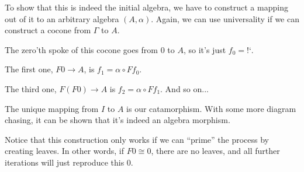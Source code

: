 \documentclass[DaoFP]{subfiles}
\begin{document}
To show that this is indeed the initial algebra, we have to construct a mapping out of it to an arbitrary algebra $(A, \alpha)$. Again, we can use universality if we can construct a cocone from $\Gamma$ to $A$. 

The zero'th spoke of this cocone goes from $0$ to $A$, so it's just $f_0 = \mbox{!`}$.

The first one, $F 0 \to A$, is $f_1 = \alpha \circ F f_0$. 

The third one, $F (F 0) \to A$ is  $f_2 = \alpha \circ F f_1$.  And so on...

The unique mapping from $I$ to $A$ is our catamorphism. With some more diagram chasing, it can be shown that it's indeed an algebra morphism. 

Notice that this construction only works if we can ``prime'' the process by creating leaves. In other words, if $F 0 \cong 0$, there are no leaves, and all further iterations will just reproduce this $0$. 
\end{document}
